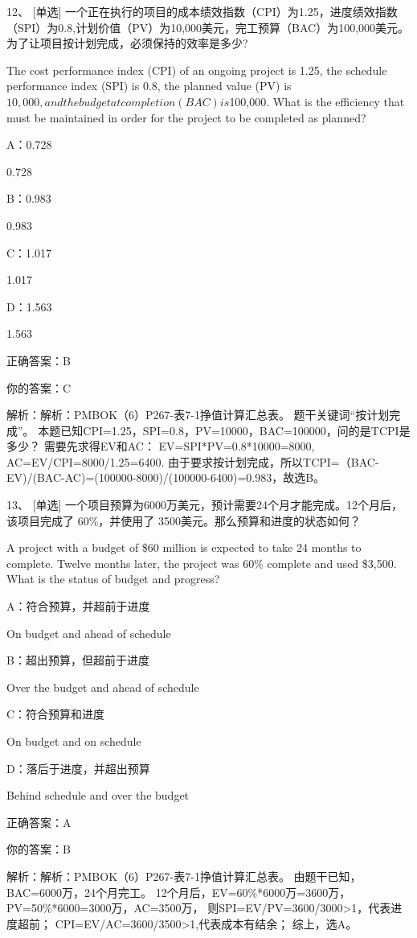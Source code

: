 12、 [单选] 一个正在执行的项目的成本绩效指数（CPI）为1.25，进度绩效指数（SPI）为0.8,计划价值（PV）为10,000美元，完工预算（BAC）为100,000美元。为了让项目按计划完成，必须保持的效率是多少?

The cost performance index (CPI) of an ongoing project is 1.25, the schedule performance index (SPI) is 0.8, the planned value (PV) is $10,000, and the budget at completion (BAC) is $100,000. What is the efficiency that must be maintained in order for the project to be completed as planned?

A：0.728

0.728

B：0.983

0.983

C：1.017

1.017

D：1.563

1.563

正确答案：B

你的答案：C

解析：解析：PMBOK（6）P267-表7-1挣值计算汇总表。 题干关键词“按计划完成”。 本题已知CPI=1.25，SPI=0.8，PV=10000，BAC=100000，问的是TCPI是多少？ 需要先求得EV和AC： EV=SPI*PV=0.8*10000=8000, AC=EV/CPI=8000/1.25=6400. 由于要求按计划完成，所以TCPI=（BAC-EV)/(BAC-AC)=(100000-8000)/(100000-6400)=0.983，故选B。


13、 [单选] 一个项目预算为6000万美元，预计需要24个月才能完成。12个月后，该项目完成了 60\%，并使用了 3500美元。那么预算和进度的状态如何？

A project with a budget of \$60 million is expected to take 24 months to complete. Twelve months later, the project was 60\% complete and used \$3,500. What is the status of budget and progress?

A：符合预算，并超前于进度

On budget and ahead of schedule

B：超出预算，但超前于进度

Over the budget and ahead of schedule

C：符合预算和进度

On budget and on schedule

D：落后于进度，并超出预算

Behind schedule and over the budget

正确答案：A

你的答案：B

解析：解析：PMBOK（6）P267-表7-1挣值计算汇总表。 由题干已知，BAC=6000万，24个月完工。 12个月后，EV=60\%*6000万=3600万，PV=50\%*6000=3000万，AC=3500万， 则SPI=EV/PV=3600/3000>1，代表进度超前； CPI=EV/AC=3600/3500>1,代表成本有结余； 综上，选A。





